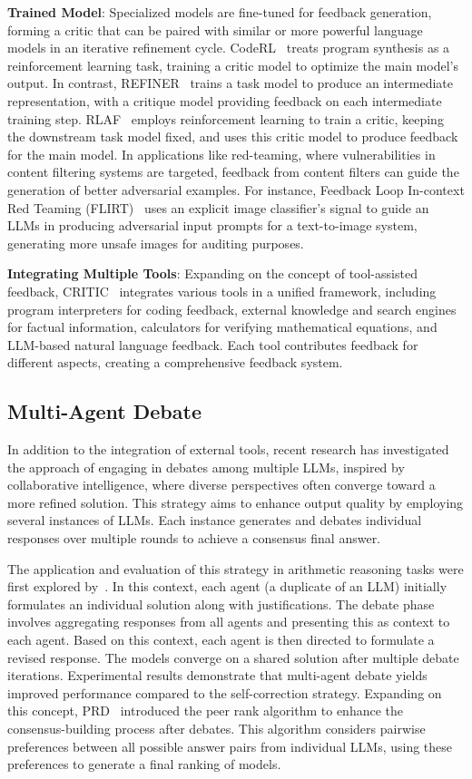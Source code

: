 \documentclass[a4paper,oneside]{book}
\begin{document}
\textbf{Trained Model}: Specialized models are fine-tuned for feedback generation, forming a critic that can be paired with similar or more powerful language models in an iterative refinement cycle. CodeRL~\cite{le2022coderl} treats program synthesis as a reinforcement learning task, training a critic model to optimize the main model's output. In contrast, REFINER~\cite{paul2023refiner} trains a task model to produce an intermediate representation, with a critique model providing feedback on each intermediate training step. RLAF~\cite{akyurek-etal-2023-rl4f} employs reinforcement learning to train a critic, keeping the downstream task model fixed, and uses this critic model to produce feedback for the main model. In applications like red-teaming, where vulnerabilities in content filtering systems are targeted, feedback from content filters can guide the generation of better adversarial examples. For instance, Feedback Loop In-context Red Teaming (FLIRT)~\cite{mehrabi2023flirt} uses an explicit image classifier's signal to guide an LLMs in producing adversarial input prompts for a text-to-image system, generating more unsafe images for auditing purposes.

\textbf{Integrating Multiple Tools}: Expanding on the concept of tool-assisted feedback, CRITIC~\cite{gou2023critic} integrates various tools in a unified framework, including program interpreters for coding feedback, external knowledge and search engines for factual information, calculators for verifying mathematical equations, and LLM-based natural language feedback. Each tool contributes feedback for different aspects, creating a comprehensive feedback system.

\subsection{Multi-Agent Debate}
In addition to the integration of external tools, recent research has investigated the approach of engaging in debates among multiple LLMs, inspired by collaborative intelligence, where diverse perspectives often converge toward a more refined solution. This strategy aims to enhance output quality by employing several instances of LLMs. Each instance generates and debates individual responses over multiple rounds to achieve a consensus final answer.

The application and evaluation of this strategy in arithmetic reasoning tasks were first explored by~\cite{du2023improving}. In this context, each agent (a duplicate of an LLM) initially formulates an individual solution along with justifications. The debate phase involves aggregating responses from all agents and presenting this as context to each agent. Based on this context, each agent is then directed to formulate a revised response. The models converge on a shared solution after multiple debate iterations. Experimental results demonstrate that multi-agent debate yields improved performance compared to the self-correction strategy. Expanding on this concept, PRD~\cite{li2023prd} introduced the peer rank algorithm to enhance the consensus-building process after debates. This algorithm considers pairwise preferences between all possible answer pairs from individual LLMs, using these preferences to generate a final ranking of models.
\end{document}
